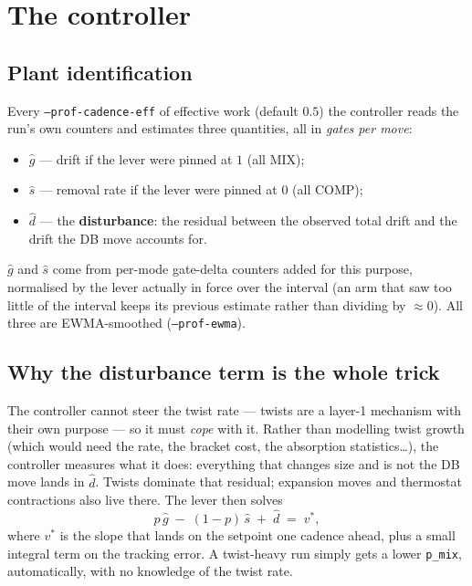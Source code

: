 \documentclass[11pt]{article}
\newcommand{\code}[1]{\texttt{#1}}
\begin{document}
\section{The controller}

\subsection{Plant identification}

Every \code{--prof-cadence-eff} of effective work (default $0.5$) the
controller reads the run's own counters and estimates three quantities, all
in \emph{gates per move}:

\begin{itemize}
\item $\hat g$ --- drift if the lever were pinned at $1$ (all MIX);
\item $\hat s$ --- removal rate if the lever were pinned at $0$ (all COMP);
\item $\hat d$ --- the \textbf{disturbance}: the residual between the
observed total drift and the drift the DB move accounts for.
\end{itemize}

$\hat g$ and $\hat s$ come from per-mode gate-delta counters added for this
purpose, normalised by the lever actually in force over the interval (an
arm that saw too little of the interval keeps its previous estimate rather
than dividing by $\approx 0$). All three are EWMA-smoothed
(\code{--prof-ewma}).

\subsection{Why the disturbance term is the whole trick}

The controller cannot steer the twist rate --- twists are a layer-1
mechanism with their own purpose --- so it must \emph{cope} with it. Rather
than modelling twist growth (which would need the rate, the bracket cost,
the absorption statistics\ldots), the controller measures what it does:
everything that changes size and is not the DB move lands in $\hat d$.
Twists dominate that residual; expansion moves and thermostat contractions
also live there. The lever then solves
\[
p\,\hat g \;-\; (1-p)\,\hat s \;+\; \hat d \;=\; v^*,
\]
where $v^*$ is the slope that lands on the setpoint one cadence ahead, plus
a small integral term on the tracking error. A twist-heavy run simply gets
a lower \code{p\_mix}, automatically, with no knowledge of the twist rate.
\end{document}

